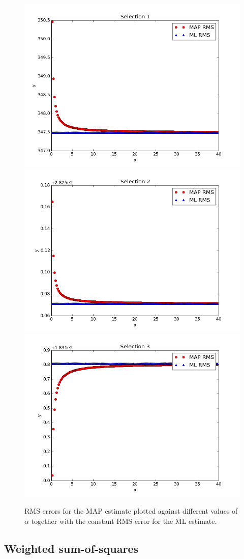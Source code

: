 \documentclass[a4paper]{article}
\begin{document}
\begin{figure}[H]
  \begin{adjustwidth}{-7em}{-7em}
    \centering
    \includegraphics[width=.32\linewidth]{figures/alpha_vs_rms_selection1.png}
    \includegraphics[width=.32\linewidth]{figures/alpha_vs_rms_selection2.png}
    \includegraphics[width=.32\linewidth]{figures/alpha_vs_rms_selection3.png}
  \end{adjustwidth}
  \caption{RMS errors for the MAP estimate plotted against different values of $\alpha$ together with the constant RMS error for the ML estimate.}
  \label{fig:alpha_vs_rms}
\end{figure}

\subsection{Weighted sum-of-squares}
\end{document}
